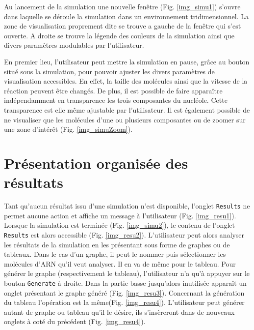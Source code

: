

Au lancement de la simulation une nouvelle fenêtre
(Fig. \ref{img_simu1}) s'ouvre dans laquelle se déroule la simulation
dans un environnement tridimensionnel. La zone de visualisation
proprement dite se trouve a gauche de la fenêtre qui s'est ouverte. A
droite se trouve la légende des couleurs de la simulation ainsi que
divers paramètres modulables par l'utilisateur.



En premier lieu, l'utilisateur peut mettre la simulation en pause, grâce au bouton situé sous la simulation, pour pouvoir ajuster les divers paramètres de visualisation accessibles. En effet, la taille des molécules ainsi que la vitesse de la réaction peuvent être changés. De plus, il est possible de faire apparaître indépendamment en transparence les trois composantes du nucléole. Cette transparence est elle même ajustable par l'utilisateur. Il est également possible de ne visualiser que les molécules d'une ou plusieurs composantes ou de zoomer sur une zone d'intérêt (Fig. \ref{img_simuZoom}).

\section{Présentation organisée des résultats}



Tant qu'aucun résultat issu d'une simulation n'est disponible,
l'onglet \texttt{Results} ne permet aucune action et affiche un
message à l'utilisateur (Fig. \ref{img_resu1}). Lorsque la simulation
est terminée (Fig. \ref{img_simu2}), le contenu de l'onglet
\texttt{Results} est alors accessible
(Fig. \ref{img_resu2}). L'utilisateur peut alors analyser les
résultats de la simulation en les présentant sous forme de graphes ou
de tableaux. Dans le cas d'un graphe, il peut le nommer puis
sélectionner les molécules d'ARN qu'il veut analyser. Il en va de même
pour le tableau. Pour générer le graphe (respectivement le tableau),
l'utilisateur n'a qu'à appuyer sur le bouton \texttt{Generate} à
droite. Dans la partie basse jusqu'alors inutilisée apparaît un onglet
présentant le graphe généré (Fig. \ref{img_resu3}). Concernant la
génération du tableau l'opération est la
même(Fig. \ref{img_resu4}). L'utilisateur peut générer autant de
graphe ou tableau qu'il le désire, ils s'insèreront dans de nouveaux
onglets à coté du précédent (Fig. \ref{img_resu4}).

